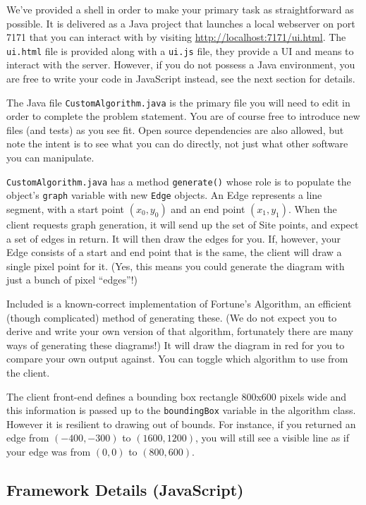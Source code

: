 \documentclass[12pt]{article}
\begin{document}
We've provided a shell in order to make your primary task as straightforward as
possible. It is delivered as a Java project that launches a local webserver on
port 7171 that you can interact with by visiting
\url{http://localhost:7171/ui.html}. The \texttt{ui.html} file is provided along with a
\texttt{ui.js} file, they provide a UI and means to interact with the server.
However, if you do not possess a Java environment, you
are free to write your code in JavaScript instead, see the next section for
details.

The Java file \texttt{CustomAlgorithm.java} is the primary file you will need to edit in
order to complete the problem statement. You are of course free to introduce new
files (and tests) as you see fit. Open source dependencies are also allowed, but
note the intent is to see what you can do directly, not just what other software you
can manipulate.

\texttt{CustomAlgorithm.java} has a method \texttt{generate()} whose role is to
populate the object's \texttt{graph} variable with new \texttt{Edge} objects. An
Edge represents a line segment, with a start point $(x_0, y_0)$ and an end point
$(x_1, y_1)$. When the client requests graph generation, it will send up the set
of Site points, and expect a set of edges in return. It will then draw the edges
for you. If, however, your Edge consists of a start and end point that is the
same, the client will draw a single pixel point for it. (Yes, this means you
could generate the diagram with just a bunch of pixel ``edges''!)

Included is a known-correct implementation of Fortune's Algorithm, an
efficient (though complicated) method of generating these. (We do not expect you
to derive and write your own version of that algorithm, fortunately there are
many ways of generating these diagrams!) It will draw the diagram in red for
you to compare your own output against. You can toggle which algorithm to use
from the client.

The client front-end defines a bounding box rectangle 800x600 pixels wide and
this information is passed up to the \texttt{boundingBox} variable in the
algorithm class. However it is resilient to drawing out of bounds. For instance,
if you returned an edge from $(-400, -300)$ to $(1600,1200)$, you will still see
a visible line as if your edge was from $(0,0)$ to $(800,600)$.

\subsection*{Framework Details (JavaScript)}
\end{document}
